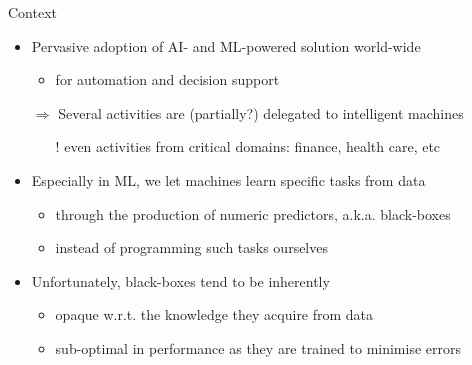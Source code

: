 \documentclass[presentation]{beamer}\mode<presentation>{\usetheme{AMSBolognaFC}}
\begin{document}
\begin{frame}{Context}
    \begin{itemize}
        \item Pervasive \alert{adoption} of AI- and ML-powered solution world-wide
        \begin{itemize}
            \item for \alert{automation} and decision support
        \end{itemize}
        
        \vfill
        
        \item[$\Rightarrow$] Several activities are (partially?) \alert{delegated} to intelligent machines
        \begin{itemize}
            \item[!] even activities from critical domains: finance, health care, etc
        \end{itemize}
        
        \vfill
        
        \item Especially in ML, we let machines learn specific tasks from data
        \begin{itemize}
            \item through the production of \alert{numeric} predictors, a.k.a. \alert{black-boxes}
            \item instead of programming such tasks ourselves
        \end{itemize}
        
        \vfill
        
        \item Unfortunately, black-boxes tend to be inherently
        \begin{itemize}
            \item \alert{opaque} w.r.t. the knowledge they acquire from data
            \item \alert{sub-optimal} in performance as they are trained to minimise errors
        \end{itemize}
        
    \end{itemize}
\end{frame}
\end{document}
